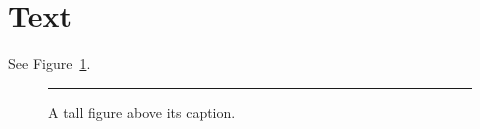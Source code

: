 \documentclass{article}
\begin{document}
\section{Text}
See Figure~\ref{fig:box}.
\newpage
\begin{figure}[t]
\centering
\rule{0.6\linewidth}{0.4\textheight}
\caption{A tall figure above its caption.}\label{fig:box}
\end{figure}
\end{document}
